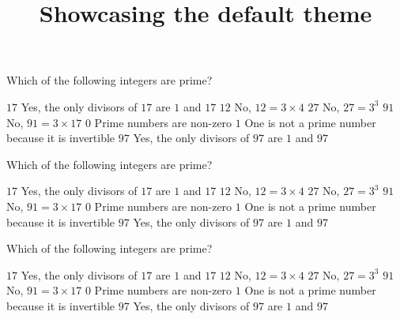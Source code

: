 \documentclass[theme=default]{webquiz}
\title{Showcasing the default theme}
\begin{document}
  \begin{question}     %
     Which of the following integers are prime?
     \begin{choice}[multiple]
       \correct   $17$ \response Yes, the only divisors of $17$ are $1$ and $17$
       \incorrect $12$ \response No, $12 = 3\times 4$
       \incorrect $27$ \response No, $27=3^3$
       \incorrect $91$ \response No, $91 = 3\times 17$
       \incorrect  $0$ \response Prime numbers are non-zero
       \incorrect  $1$ \response One is not a prime number because it is invertible
       \correct   $97$ \response Yes, the only divisors of $97$ are $1$ and $97$
     \end{choice}
  \end{question}

  \begin{question}     %
     Which of the following integers are prime?
     \begin{choice}[multiple]
       \correct   $17$ \response Yes, the only divisors of $17$ are $1$ and $17$
       \incorrect $12$ \response No, $12 = 3\times 4$
       \incorrect $27$ \response No, $27=3^3$
       \incorrect $91$ \response No, $91 = 3\times 17$
       \incorrect  $0$ \response Prime numbers are non-zero
       \incorrect  $1$ \response One is not a prime number because it is invertible
       \correct   $97$ \response Yes, the only divisors of $97$ are $1$ and $97$
     \end{choice}
  \end{question}

  \begin{question}     %
     Which of the following integers are prime?
     \begin{choice}[multiple]
       \correct   $17$ \response Yes, the only divisors of $17$ are $1$ and $17$
       \incorrect $12$ \response No, $12 = 3\times 4$
       \incorrect $27$ \response No, $27=3^3$
       \incorrect $91$ \response No, $91 = 3\times 17$
       \incorrect  $0$ \response Prime numbers are non-zero
       \incorrect  $1$ \response One is not a prime number because it is invertible
       \correct   $97$ \response Yes, the only divisors of $97$ are $1$ and $97$
     \end{choice}
  \end{question}
\end{document}
